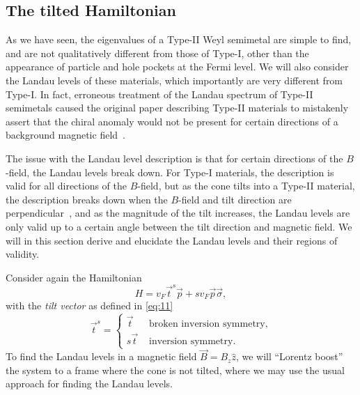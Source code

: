 \subsection{The tilted Hamiltonian}\label{sec:ll-tilt}
As we have seen, the eigenvalues of a Type-II Weyl semimetal are simple to find, and are not qualitatively different from those of Type-I, other than the appearance of particle and hole pockets at the Fermi level.
We will also consider the Landau levels of these materials, which importantly are very different from Type-I.
In fact, erroneous treatment of the Landau spectrum of Type-II semimetals caused the original paper describing Type-II materials to mistakenly assert that the chiral anomaly would not be present for certain directions of a background magnetic field~\cites{soluyanovTypeIIWeylSemimetals2015,sharmaChiralAnomalyLongitudinal2017}.

The issue with the Landau level description is that for certain directions of the \(B\)-field, the Landau levels break down.
For Type-I materials, the description is valid for all directions of the \(B\)-field, but as the cone tilts into a Type-II material, the description breaks down when the \(B\)-field and tilt direction are perpendicular~\cite{sharmaChiralAnomalyLongitudinal2017}, and as the magnitude of the tilt increases, the Landau levels are only valid up to a certain angle between the tilt direction and magnetic field.
We will in this section derive and elucidate the Landau levels and their regions of validity.

Consider again the Hamiltonian
\begin{equation}
  \label{eq:29}
  H = v_{F} \vec{t}^s  \vec{p} + s v_{F} \vec{p} \vec{\sigma},
\end{equation}
with the \emph{tilt vector} as defined in \cref{eq:11}
\[
  \vec{t}^s
  =
  \begin{cases}
    \vec{t} & \text{ broken inversion symmetry},\\
    s \vec{t} & \text{ inversion symmetry}.
  \end{cases}
\]
To find the Landau levels in a magnetic field \(\vec{B} = B_{z}\hat{z} \), we will ``Lorentz boost'' the system to a frame where the cone is not tilted, where we may use the usual approach for finding the Landau levels.


